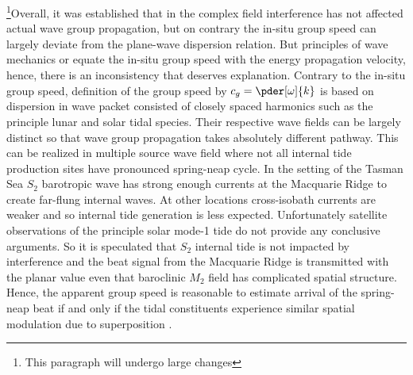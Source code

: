 \documentclass[12pt]{article}
\begin{document}
\footnote{This paragraph will undergo large changes}Overall, it was established that in the complex 
field interference has not affected 
actual wave group propagation, but on contrary the in-situ group speed can largely deviate from the 
plane-wave dispersion relation. But principles of wave mechanics \citep[e.g.,][]{Lighthill2001} or 
\citep[e.g.,][]{leblond1978preface} equate the in-situ group speed with the energy propagation 
velocity, hence, there is an inconsistency that deserves explanation. Contrary to the in-situ group 
speed, definition of the group speed by $c_g = \pder[\omega]{k}$ is based on dispersion in wave 
packet consisted of closely 
spaced harmonics such as the principle lunar and solar tidal species. Their respective wave fields 
can be largely distinct so that wave group propagation takes absolutely different pathway. This can 
be realized in multiple source wave field where not all internal tide production sites have 
pronounced spring-neap cycle. In the setting of the Tasman Sea $S_2$ barotropic wave has strong 
enough currents at the Macquarie Ridge to create far-flung internal waves. At other locations 
cross-isobath currents are weaker and so internal tide generation is less expected. Unfortunately 
satellite observations of the principle solar mode-1 tide \citep{zhao2017global} do not provide any 
conclusive arguments. So it is speculated that $S_2$ internal tide is not impacted by interference 
and the beat signal from the Macquarie Ridge is transmitted with the planar value even that 
baroclinic $M_2$ field has complicated spatial structure. Hence, the apparent group speed is 
reasonable to estimate arrival of the spring-neap beat if and only if the tidal constituents 
experience similar spatial modulation due to superposition \citep[e.g.,][]{holloway2003spring}.\\
\end{document}
